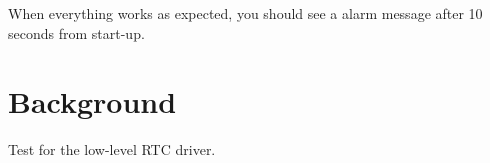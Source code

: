 When everything works as expected, you should see a alarm message after 10 seconds from start-\/up.

\section*{Background }

Test for the low-\/level R\+TC driver. 